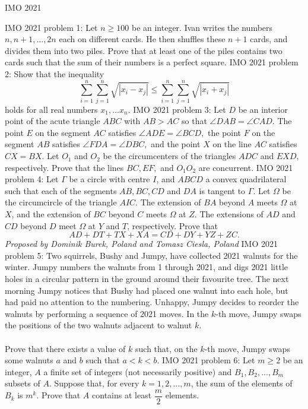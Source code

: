 
IMO 2021 

IMO 2021 problem 1:  Let $n \geqslant 100$ be an integer. Ivan writes the numbers $n, n+1, \ldots, 2 n$ each on different cards. He then shuffles these $n+1$ cards, and divides them into two piles. Prove that at least one of the piles contains two cards such that the sum of their numbers is a perfect square. 
IMO 2021 problem 2:  Show that the inequality
\[
\sum_{i=1}^n \sum_{j=1}^n \sqrt{|x_i-x_j|}\leqslant \sum_{i=1}^n \sum_{j=1}^n \sqrt{|x_i+x_j|}
\]
holds for all real numbers $x_1,\ldots x_n.$ 
IMO 2021 problem 3:  Let $D$ be an interior point of the acute triangle $ABC$ with $AB > AC$ so that $\angle DAB = \angle CAD.$ The point $E$ on the segment $AC$ satisfies $\angle ADE =\angle BCD,$ the point $F$ on the segment $AB$ satisfies $\angle FDA =\angle DBC,$ and the point $X$ on the line $AC$ satisfies $CX = BX.$ Let $O_1$ and $O_2$ be the circumcenters of the triangles $ADC$ and $EXD,$ respectively. Prove that the lines $BC, EF,$ and $O_1O_2$ are concurrent. 
IMO 2021 problem 4:  Let $\Gamma$ be a circle with centre $I$, and $A B C D$ a convex quadrilateral such that each of the segments $A B, B C, C D$ and $D A$ is tangent to $\Gamma$. Let $\Omega$ be the circumcircle of the triangle $A I C$. The extension of $B A$ beyond $A$ meets $\Omega$ at $X$, and the extension of $B C$ beyond $C$ meets $\Omega$ at $Z$. The extensions of $A D$ and $C D$ beyond $D$ meet $\Omega$ at $Y$ and $T$, respectively. Prove that
\[ A D+D T+T X+X A=C D+D Y+Y Z+Z C. \]
\textit{Proposed by Dominik Burek, Poland and Tomasz Ciesla, Poland} 
IMO 2021 problem 5:  Two squirrels, Bushy and Jumpy, have collected 2021 walnuts for the winter. Jumpy numbers the walnuts from 1 through 2021, and digs 2021 little holes in a circular pattern in the ground around their favourite tree. The next morning Jumpy notices that Bushy had placed one walnut into each hole, but had paid no attention to the numbering. Unhappy, Jumpy decides to reorder the walnuts by performing a sequence of 2021 moves. In the $k$-th move, Jumpy swaps the positions of the two walnuts adjacent to walnut $k$. \\\\
Prove that there exists a value of $k$ such that, on the $k$-th move, Jumpy swaps some walnuts $a$ and $b$ such that $a<k<b$. 
IMO 2021 problem 6:  Let $m\ge 2$ be an integer, $A$ a finite set of integers (not necessarily positive) and $B_1,B_2,...,B_m$ subsets of $A$. Suppose that, for every $k=1,2,...,m$, the sum of the elements of $B_k$ is $m^k$. Prove that $A$ contains at least $\dfrac{m}{2}$ elements. 

